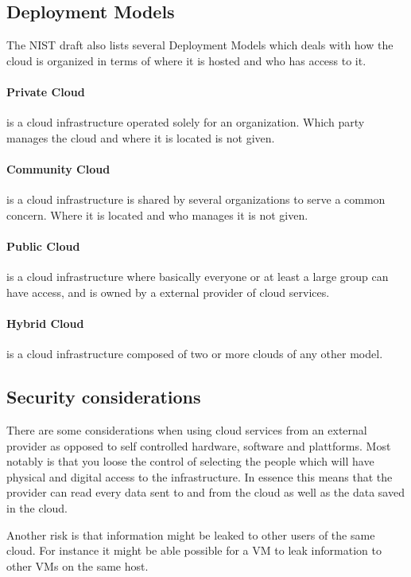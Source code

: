 \documentclass[pdftex,english,10pt,b5paper,twoside]{book}
\begin{document}
\subsection{Deployment Models}
The \ac{NIST} draft also lists several Deployment Models which deals with how
the cloud is organized in terms of where it is hosted and who has access to it.

\paragraph{Private Cloud} is a cloud infrastructure operated solely for an
organization. Which party manages the cloud and where it is located is not
given.

\paragraph{Community Cloud} is a cloud infrastructure is shared by several
organizations to serve a common concern. Where it is located and who manages it
is not given.

\paragraph{Public Cloud} is a cloud infrastructure where basically everyone or
at least a large group can have access, and is owned by a external provider of
cloud services.

\paragraph{Hybrid Cloud} is a cloud infrastructure composed of two or more
clouds of any other model.

\subsection{Security considerations}
There are some considerations when using cloud services from an external provider
as opposed to self controlled hardware, software and plattforms. Most notably
is that you loose the control of selecting the people which will have physical
and digital access to the infrastructure. In essence this means that the
provider can read every data sent to and from the cloud as well as the data
saved in the cloud.

Another risk is that information might be leaked to other users of the same
cloud. For instance it might be able possible for a \ac{VM} to leak information
to other \ac{VM}s on the same host.
\end{document}
